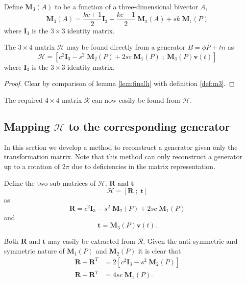 \begin{definition}
\label{def:m3}
Define $\mathbf{M}_3(A)$ to be a function of a three-dimensional bivector $A$,
\[
\mathbf{M}_3(A) = \frac{kc+1}{2} \mathbf{I}_3 
+ \frac{kc-1}{2} \;\mathbf{M}_2(A) + sk\;\mathbf{M}_1(P)
\]
where  $\mathbf{I}_3$ is the $3\times3$ identity matrix.
\end{definition}

\begin{thm}
The $3\times4$ matrix $\mathcal{H}$ may be found directly from a
generator $B=\phi P + tn$ as
\[
\mathcal{H} = \left[
 c^2\mathbf{I}_3 - s^2\;\mathbf{M}_2(P) + 2sc\;\mathbf{M}_1(P) \; ; \;
 \mathbf{M}_3(P)\mathbf{v}(t)
\right]
\]
where  $\mathbf{I}_3$ is the $3\times3$ identity matrix.
\begin{proof}
Clear by comparison of lemma \ref{lem:finalh} with definition \ref{def:m3}.
\end{proof}
\end{thm}

\noindent The required $4\times4$ matrix $\mathcal{R}$ can now easily be found from $\mathcal{H}$.

\subsection{Mapping $\mathcal{H}$ to the corresponding generator}

In this section we develop a method to reconstruct a generator given only the
transformation matrix. Note that this method can only reconstruct a generator
up to a rotation of $2\pi$ due to deficiencies in the matrix representation.

\begin{definition}
Define the two sub matrices of $\mathcal{H}$,
$\mathbf{R}$ and $\mathbf{t}$
\[
\mathcal{H} = [ \mathbf{R}\; ; \; \mathbf{t} ]
\]
as 
\begin{equation}
\mathbf{R} = c^2\mathbf{I}_3 - s^2\;\mathbf{M}_2(P) + 2sc\;\mathbf{M}_1(P)\label{eqn:A}
\end{equation}
and
\begin{equation}
\mathbf{t} = \mathbf{M}_3(P)\mathbf{v}(t). \label{eqn:b}
\end{equation}
\end{definition}

Both $\mathbf{R}$ and $\mathbf{t}$ may easily be extracted from $\mathcal{R}$.
Given the anti-symmetric and symmetric nature
of $\mathbf{M}_1(P)$ and $\mathbf{M}_2(P)$ it is clear that
\begin{align*}
\mathbf{R} + \mathbf{R}^T &= 
2\left[ c^2\mathbf{I}_3 - s^2\;\mathbf{M}_2(P) \right] \\
\mathbf{R} - \mathbf{R}^T &= 
4sc\;\mathbf{M}_1(P).
\end{align*} 

